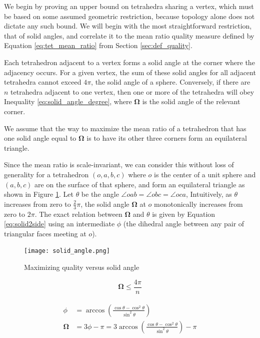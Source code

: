 We begin by proving an upper bound on tetrahedra sharing a vertex,
which must be based on some assumed geometric restriction,
because topology alone does not dictate any such bound.
We will begin with the most straightforward restriction, that
of solid angles, and correlate it to the mean ratio quality measure
defined by Equation \ref{eq:tet_mean_ratio} from Section \ref{sec:def_quality}.

Each tetrahedron adjacent to a vertex forms a solid angle at
the corner where the adjacency occurs.
For a given vertex, the sum of these solid angles for all
adjacent tetrahedra cannot exceed $4\pi$, the solid angle of a sphere.
Conversely, if there are $n$ tetrahedra adjacent to one vertex,
then one or more of the tetrahedra will obey Inequality
\ref{eq:solid_angle_degree}, where $\mathbf{\Omega}$ is the
solid angle of the relevant corner.

We assume that the way to maximize the mean ratio of a tetrahedron
that has one solid angle equal to $\mathbf{\Omega}$ is to have
its other three corners form an equilateral triangle.

Since the mean ratio is scale-invariant, we can consider this
without loss of generality for a tetrahedron $(o,a,b,c)$ where
$o$ is the center of a unit sphere and $(a,b,c)$ are on the surface
of that sphere, and form an equilateral triangle
as shown in Figure \ref{fig:solid_angle}.
Let $\theta$ be the angle $\angle oab = \angle obc = \angle oca$,
Intuitively, as $\theta$ increases from zero to $\frac23\pi$,
the solid angle $\mathbf{\Omega}$ at $o$ monotonically
increases from zero to $2\pi$.
The exact relation between $\mathbf{\Omega}$ and $\theta$ is given by Equation
\ref{eq:solid2side}
using an intermediate $\phi$ (the dihedral angle between any pair of triangular
faces meeting at $o$).

\begin{figure}
\begin{center}
\texttt{[image: solid\_angle.png]}
\caption{Maximizing quality versus solid angle}
\label{fig:solid_angle}
\end{center}
\end{figure}

\begin{equation} \label{eq:solid_angle_degree}
\mathbf{\Omega} \leq \frac{4\pi}{n}
\end{equation}

\begin{gather} \label{eq:solid2side}
\begin{split}
\phi &= \arccos\left(\frac{\cos\theta - \cos^2\theta}{\sin^2\theta}\right) \\
\mathbf{\Omega} &= 3\phi - \pi = 3\arccos\left(\frac{\cos\theta - \cos^2\theta}{\sin^2\theta}\right) - \pi
\end{split}
\end{gather}

